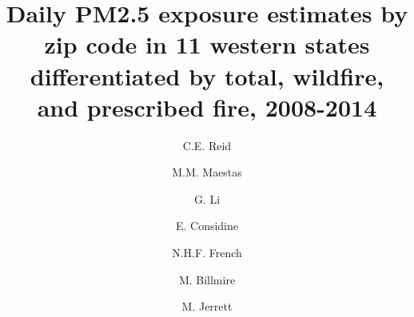 \documentclass[authoryear]{elsarticle}
\begin{document}
\begin{frontmatter}

\title{Daily PM2.5 exposure estimates by zip code in 11 western states differentiated by total, wildfire, and prescribed fire, 2008-2014}%


\author[mymainaddress]{C.E. Reid}


\author[mysecondaryaddress]{M.M. Maestas}

\author[mysecondaryaddress]{G. Li}

\author[mysecondaryaddress]{E. Considine}

\author[mythirdaddress]{N.H.F. French}

\author[mythirdaddress]{M. Billmire}

\author[myfourthaddress]{M. Jerrett}


\address[mymainaddress]{Department of Geography, Guggenheim 110, 260 UCB, Boulder, Colorado 80309}%
\address[mysecondaryaddress]{4001 Discovery Dr., SEEC Building Suite S348, UCB 611, Boulder, CO 80303}
\address[mythirdaddress]{Michigan Tech Research Institute, Michigan Technological University, 3600 Green Court, Suite 100, Ann Arbor, MI 48105}
\address[myfourthaddress]{UCLA Fielding School of Public Health, 650 Charles E. Young Drive South, 56-070B CHS, Los Angeles, CA 90095}


\end{frontmatter}
\end{document}
